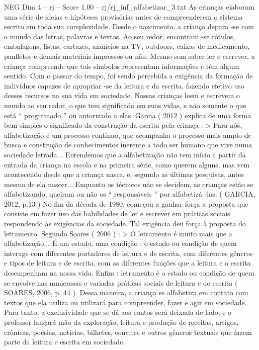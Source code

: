 \begin{textsample}{NEG Dim 4 – rj – Score 1.00 – rj/rj\_inf\_alfabetizar\_3.txt}  \label{ex:f4_neg_127}
As crianças elaboram uma série de ideias e hipóteses provisórias antes de compreenderem o sistema escrito em toda sua complexidade.
Desde o nascimento, a criança depara -se com o mundo das letras, palavras e textos.
Ao seu redor, encontram -se rótulos, embalagens, listas, cartazes, anúncios na TV, outdoors, caixas de medicamento, panfletos e demais materiais impressos ou não.
Mesmo sem saber ler e escrever, a criança compreende que tais símbolos representam informações e têm algum sentido.
Com o passar do tempo, foi sendo percebida a exigência da formação de indivíduos capazes de apropriar -se da leitura e da escrita, fazendo efetivo uso desses recursos na sua vida em sociedade.
Nossas crianças leem e escrevem o mundo ao seu redor, o que tem significado em suas vidas, e não somente o que está “ programado ” ou autorizado a elas.
Garcia ( 2012 ) explica de uma forma bem simples o significado da construção da escrita pela criança : > Para nós, alfabetização é um processo contínuo, que acompanha o processo mais amplo de busca e construção de conhecimentos inerente a todo ser humano que vive numa sociedade letrada...
Entendemos que a alfabetização não tem início a partir da entrada da criança na escola e na primeira série, como querem alguns, mas vem acontecendo desde que a criança nasce, e, segundo as últimas pesquisas, antes mesmo de ela nascer...
Enquanto os técnicos não se decidem, as crianças estão se alfabetizando, queiram ou não os “ responsáveis ” por alfabetizá -las. ( GARCIA, 2012, p.13 ) No fim da década de 1980, começou a ganhar força a proposta que consiste em fazer uso das habilidades de ler e escrever em práticas sociais respondendo às exigências da sociedade.
Tal exigência deu força à proposta do letramento.
Segundo Soares ( 2006 ) : > O letramento é muito mais que a alfabetização...
É um estado, uma condição : o estado ou condição de quem interage com diferentes portadores de leitura e de escrita, com diferentes gêneros e tipos de leitura e de escrita, com as diferentes funções que a leitura e a escrita desempenham na nossa vida.
Enfim : letramento é o estado ou condição de quem se envolve nas numerosas e variadas práticas sociais de leitura e de escrita ( SOARES, 2006, p. 44 ).
Dessa maneira, a criança se alfabetiza em contato com textos que ela utiliza ou utilizará para compreender, fazer e agir em sociedade.
Para tanto, a exclusividade que se dá aos contos será deixada de lado, e o professor lançará mão da exploração, leitura e produção de receitas, artigos, crônicas, poesias, notícias, bilhetes, convites e outros gêneros textuais que fazem parte da leitura e escrita em sociedade.

\end{textsample}
